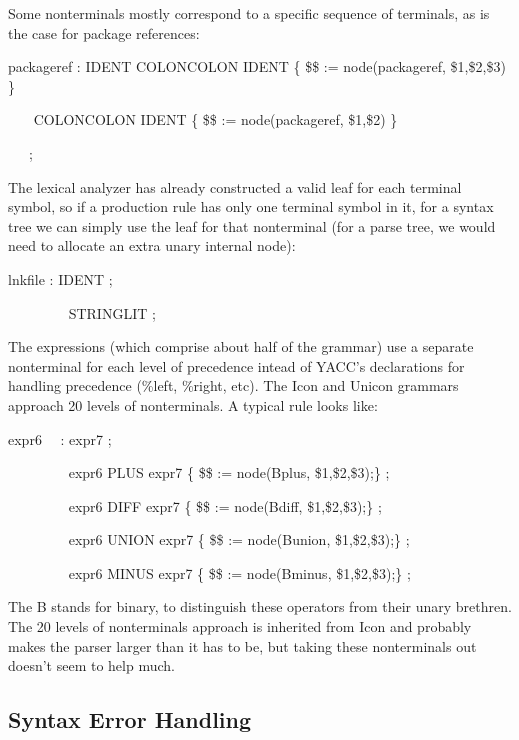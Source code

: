 Some nonterminals mostly correspond to a specific sequence of
terminals, as is the case for package references:

{\ttfamily\mdseries
packageref : IDENT COLONCOLON IDENT \{ \$\$ := node({\textquotedbl}packageref{\textquotedbl}, \$1,\$2,\$3) \} }

{\ttfamily\mdseries
\ \ \ {\textbar} COLONCOLON IDENT \{ \$\$ := node({\textquotedbl}packageref{\textquotedbl}, \$1,\$2) \} \ }

{\ttfamily\mdseries
\ \ \ ;}


The lexical analyzer has already constructed a valid
{\textquotedbl}leaf{\textquotedbl} for each terminal symbol, so if a
production rule has only one terminal symbol in it, for a syntax tree
we can simply use the leaf for that nonterminal (for a parse tree, we
would need to allocate an extra unary internal node):

{\ttfamily\mdseries
lnkfile : IDENT ;}

{\ttfamily\mdseries
\ \ \ \ \ \ \ \ {\textbar} STRINGLIT ;}


The expressions (which comprise about half of the grammar) use a
separate nonterminal for each level of precedence intead of YACC's
declarations for handling precedence (\%left, \%right, etc). The Icon
and Unicon grammars approach 20 levels of nonterminals. A typical rule
looks like:

{\ttfamily\mdseries
expr6 \ \ : expr7 ;}

{\ttfamily\mdseries
\ \ \ \ \ \ \ \ {\textbar} expr6 PLUS expr7 \{ \$\$ := node({\textquotedbl}Bplus{\textquotedbl}, \$1,\$2,\$3);\} ;}

{\ttfamily\mdseries
\ \ \ \ \ \ \ \ {\textbar} expr6 DIFF expr7 \{ \$\$ := node({\textquotedbl}Bdiff{\textquotedbl}, \$1,\$2,\$3);\} ;}

{\ttfamily\mdseries
\ \ \ \ \ \ \ \ {\textbar} expr6 UNION expr7 \{ \$\$ := node({\textquotedbl}Bunion{\textquotedbl}, \$1,\$2,\$3);\} ;}

{\ttfamily\mdseries
\ \ \ \ \ \ \ \ {\textbar} expr6 MINUS expr7 \{ \$\$ := node({\textquotedbl}Bminus{\textquotedbl}, \$1,\$2,\$3);\} ;}


The {\textquotedbl}B{\textquotedbl} stands for
{\textquotedbl}binary{\textquotedbl}, to distinguish these operators
from their unary brethren. The 20 levels of nonterminals approach is
inherited from Icon and probably makes the parser larger than it has
to be, but taking these nonterminals out doesn't seem to help much.

\subsection{Syntax Error Handling }

